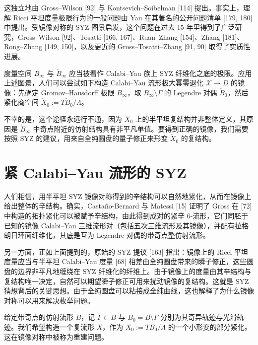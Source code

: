 这独立地由 Gross--Wilson [92] 与 Kontsevich--Soibelman [114] 提出。事实上，理解 Ricci 平坦度量极限行为的一般问题由 Yau 在其著名的公开问题清单 [179, 180] 中提出。受镜像对称的 SYZ 图景启发，这个问题在过去 15 年里得到了广泛研究，Gross--Wilson [92]、Tosatti [166, 167]、Ruan--Zhang [154]、Zhang [181]、Rong--Zhang [149, 150]，以及更近的 Gross--Tosatti--Zhang [91, 90] 取得了实质性进展。

度量空间 $B_\infty$ 与 $\check B_\infty$ 应当被看作 Calabi--Yau 族上 SYZ 纤维化之底的极限。应用上述图景，人们可以尝试如下构造 Calabi--Yau 流形极大幂零退化 $\mathcal{X}\to D$ 的镜像：先确定 Gromov--Hausdorff 极限 $B_\infty$，取 $B_\infty\setminus\Gamma$ 的 Legendre 对偶 $\check B_0$，然后紧化商空间 $\check X_0:=T\check B_0/\Lambda$。

不幸的是，这个途径永远行不通，因为 $\check X_0$ 上的半平坦复结构并非整体定义，其原因是 $\check B_\infty$ 中奇点附近的仿射结构具有非平凡单值。要得到正确的镜像，我们需要按照 SYZ 的建议，用来自全纯圆盘的量子修正来形变 $\check X_0$ 的复结构。

\section{紧 Calabi--Yau 流形的 SYZ}
人们相信，用半平坦 SYZ 镜像对称得到的辛结构可以自然地紧化，从而在镜像上给出整体的辛结构。确实，Castaño-Bernard 与 Matessi [15] 证明了 Gross 在 [72] 中构造的拓扑紧化可以被赋予辛结构，由此得到成对的紧辛 6-流形，它们同胚于已知的镜像 Calabi--Yau 三维流形对（包括五次三维流形及其镜像），并配有拉格朗日环面纤维化，其底是互为 Legendre 对偶的带奇点整仿射流形。

另一方面，正如上面提到的，原始的 SYZ 提议 [163] 指出：镜像上的 Ricci 平坦度量应当与半平坦 Calabi--Yau 度量 [68] 相差由全纯圆盘带来的瞬子修正，这些圆盘的边界非平凡地缠绕在 SYZ 纤维化的纤维上。由于镜像上的度量由其辛结构与复结构唯一决定，自然可以期望瞬子修正可用来扰动镜像的复结构。这就是 SYZ 猜想背后的关键思想。由于全纯圆盘可以粘接成全纯曲线，这也解释了为什么镜像对称可以用来解决枚举问题。

给定带奇点的仿射流形 $B$，记 $\Gamma\subset B$ 与 $B_0=B\setminus\Gamma$ 分别为其奇异轨迹与光滑轨迹。我们希望构造一个复流形 $X$，作为 $X_0:=TB_0/\Lambda$ 的一个小形变的部分紧化。这在镜像对称中被称为重建问题。

